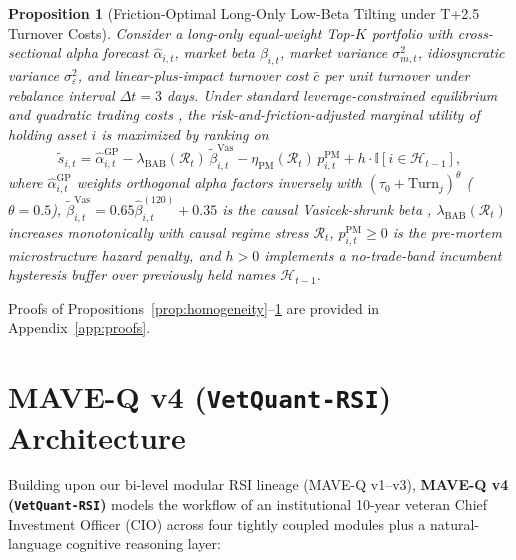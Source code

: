 \documentclass[11pt]{article}
\newtheorem{proposition}{Proposition}
\begin{document}
\begin{proposition}[Friction-Optimal Long-Only Low-Beta Tilting under T+2.5 Turnover Costs]
\label{prop:bab_friction}
Consider a long-only equal-weight Top-$K$ portfolio with cross-sectional alpha forecast $\hat{\alpha}_{i,t}$, market beta $\beta_{i,t}$, market variance $\sigma^2_{m,t}$, idiosyncratic variance $\sigma^2_{\varepsilon}$, and linear-plus-impact turnover cost $\bar{c}$ per unit turnover under rebalance interval $\Delta t = 3$ days. Under standard leverage-constrained equilibrium \citep{frazzini2014bab} and quadratic trading costs \citep{garleanu2013dynamic}, the risk-and-friction-adjusted marginal utility of holding asset $i$ is maximized by ranking on
\begin{equation}
  \tilde{s}_{i,t} = \hat{\alpha}^{\text{GP}}_{i,t} - \lambda_{\text{BAB}}(\mathcal{R}_t)\,\tilde{\beta}^{\text{Vas}}_{i,t} - \eta_{\text{PM}}(\mathcal{R}_t)\,p^{\text{PM}}_{i,t} + h \cdot \mathbb{I}[i \in \mathcal{H}_{t-1}],
  \label{eq:cio_score}
\end{equation}
where $\hat{\alpha}^{\text{GP}}_{i,t}$ weights orthogonal alpha factors inversely with $(\tau_0 + \text{Turn}_j)^{\theta}$ ($\theta = 0.5$), $\tilde{\beta}^{\text{Vas}}_{i,t} = 0.65 \hat{\beta}_{i,t}^{(120)} + 0.35$ is the causal Vasicek-shrunk beta \citep{vasicek1973note}, $\lambda_{\text{BAB}}(\mathcal{R}_t)$ increases monotonically with causal regime stress $\mathcal{R}_t$, $p^{\text{PM}}_{i,t} \ge 0$ is the pre-mortem microstructure hazard penalty, and $h > 0$ implements a no-trade-band incumbent hysteresis buffer over previously held names $\mathcal{H}_{t-1}$.
\end{proposition}
Proofs of Propositions~\ref{prop:homogeneity}--\ref{prop:bab_friction} are provided in Appendix~\ref{app:proofs}.

\section{MAVE-Q v4 (\texttt{VetQuant-RSI}) Architecture}
\label{sec:arch}
Building upon our bi-level modular RSI lineage (MAVE-Q v1--v3), \textbf{MAVE-Q v4 (\texttt{VetQuant-RSI})} models the workflow of an institutional 10-year veteran Chief Investment Officer (CIO) across four tightly coupled modules plus a natural-language cognitive reasoning layer:
\end{document}
